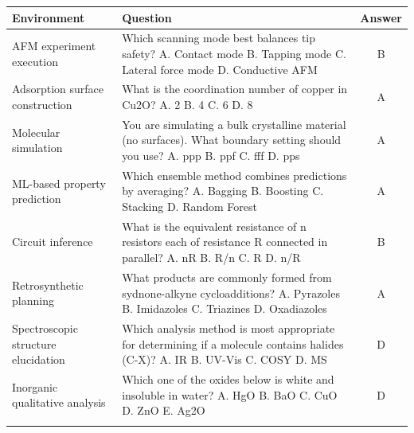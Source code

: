\begin{tabularx}{\textwidth}{p{2.5cm} X c}
\toprule
\textbf{Environment} & \textbf{Question} & \textbf{Answer} \\
\midrule
AFM experiment execution & Which scanning mode best balances tip safety? A. Contact mode  B. Tapping mode  C. Lateral force mode  D. Conductive AFM & B \\
\addlinespace
Adsorption surface construction & What is the coordination number of copper in Cu2O? A. 2  B. 4  C. 6  D. 8 & A \\
\addlinespace
Molecular simulation & You are simulating a bulk crystalline material (no surfaces). What boundary setting should you use? A. ppp  B. ppf  C. fff  D. pps & A \\
\addlinespace
ML-based property prediction & Which ensemble method combines predictions by averaging? A. Bagging  B. Boosting  C. Stacking  D. Random Forest & A \\
\addlinespace
Circuit inference & What is the equivalent resistance of n resistors each of resistance R connected in parallel? A. nR  B. R/n  C. R  D. n/R & B \\
\addlinespace
Retrosynthetic planning & What products are commonly formed from sydnone-alkyne cycloadditions? A. Pyrazoles  B. Imidazoles  C. Triazines  D. Oxadiazoles & A \\
\addlinespace
Spectroscopic structure elucidation & Which analysis method is most appropriate for determining if a molecule contains halides (C-X)? A. IR  B. UV-Vis  C. COSY  D. MS & D \\
\addlinespace
Inorganic qualitative analysis & Which one of the oxides below is white and insoluble in water? A. HgO  B. BaO  C. CuO  D. ZnO  E. Ag2O & D \\
\addlinespace
\bottomrule
\end{tabularx}